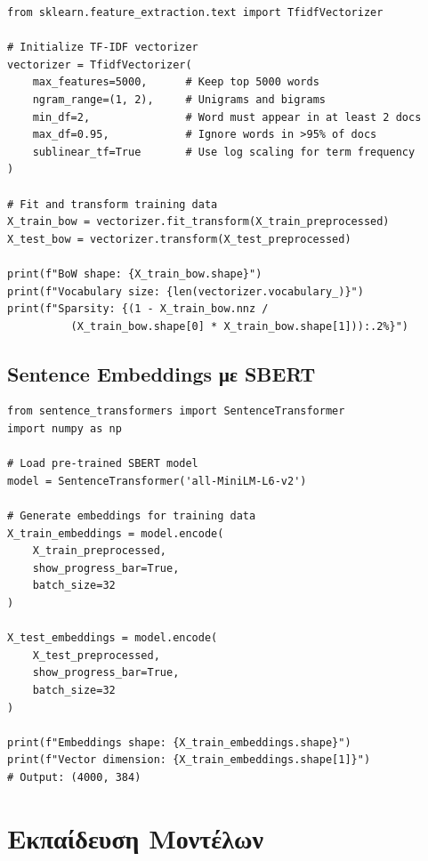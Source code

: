 \documentclass[12pt,a4paper,twoside]{book}
\begin{document}
\begin{tcolorbox}[myCustomStyle={BoW Feature Extraction}]
    \begin{lstlisting}[style=myPythonStyle]
from sklearn.feature_extraction.text import TfidfVectorizer

# Initialize TF-IDF vectorizer
vectorizer = TfidfVectorizer(
    max_features=5000,      # Keep top 5000 words
    ngram_range=(1, 2),     # Unigrams and bigrams
    min_df=2,               # Word must appear in at least 2 docs
    max_df=0.95,            # Ignore words in >95% of docs
    sublinear_tf=True       # Use log scaling for term frequency
)

# Fit and transform training data
X_train_bow = vectorizer.fit_transform(X_train_preprocessed)
X_test_bow = vectorizer.transform(X_test_preprocessed)

print(f"BoW shape: {X_train_bow.shape}")
print(f"Vocabulary size: {len(vectorizer.vocabulary_)}")
print(f"Sparsity: {(1 - X_train_bow.nnz / 
          (X_train_bow.shape[0] * X_train_bow.shape[1])):.2%}")
\end{lstlisting}
\end{tcolorbox}

\subsection{Sentence Embeddings με SBERT}

\begin{tcolorbox}[myCustomStyle={Sentence Embeddings Extraction}]
    \begin{lstlisting}[style=myPythonStyle]
from sentence_transformers import SentenceTransformer
import numpy as np

# Load pre-trained SBERT model
model = SentenceTransformer('all-MiniLM-L6-v2')

# Generate embeddings for training data
X_train_embeddings = model.encode(
    X_train_preprocessed,
    show_progress_bar=True,
    batch_size=32
)

X_test_embeddings = model.encode(
    X_test_preprocessed,
    show_progress_bar=True,
    batch_size=32
)

print(f"Embeddings shape: {X_train_embeddings.shape}")
print(f"Vector dimension: {X_train_embeddings.shape[1]}")
# Output: (4000, 384)
\end{lstlisting}
\end{tcolorbox}

\section{Εκπαίδευση Μοντέλων}
\end{document}
